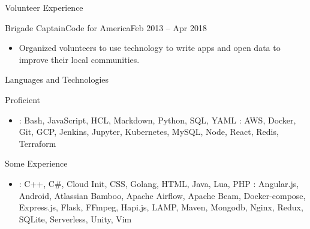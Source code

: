 \documentclass[]{mcdowellcv}
\begin{document}
    \begin{cvsection}{Volunteer Experience}
        \begin{cvsubsection}{Brigade Captain}{Code for America}{Feb 2013 – Apr 2018}
            \begin{itemize}
                \item Organized volunteers to use technology to write apps and open data to improve their local communities.
            \end{itemize}

        \end{cvsubsection}

    \end{cvsection}

    \begin{cvsection}{Languages and Technologies}
        \begin{cvsubsection}{Proficient}{}{}
            \begin{itemize}
                    \item {}: Bash, JavaScript, HCL, Markdown, Python, SQL, YAML \newline
                    : AWS, Docker, Git, GCP, Jenkins, Jupyter, Kubernetes, MySQL, Node, React, Redis, Terraform
            \end{itemize}
        \end{cvsubsection}
        \begin{cvsubsection}{Some Experience}{}{}
            \begin{itemize}
                    \item {}: C++, C\#, Cloud Init, CSS, Golang, HTML, Java, Lua, PHP  \newline
                    : Angular.js, Android, Atlassian Bamboo, Apache Airflow, Apache Beam,  Docker-compose, \newline Express.js, Flask, FFmpeg, Hapi.js, LAMP, Maven, Mongodb, Nginx, Redux, SQLite, Serverless, Unity, Vim
            \end{itemize}
        \end{cvsubsection}
    \end{cvsection}
\end{document}
